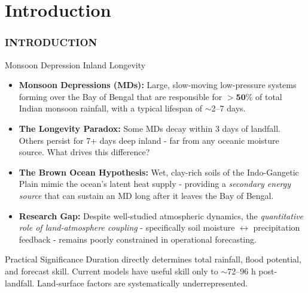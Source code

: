 \documentclass[10pt, aspectratio=169,t,xcolor=table]{beamer}
\begin{document}
\section{Introduction}
\begin{frame}{}
	\frametitle{INTRODUCTION}
\end{frame}

\begin{frame}{Monsoon Depression Inland Longevity}
	\footnotesize
	\begin{itemize}
		\item \textbf{Monsoon Depressions (MDs):} Large, slow-moving low-pressure systems
		      forming over the Bay of Bengal that are responsible for $\mathbf{>50\%}$ of
		      total Indian monsoon rainfall, with a typical lifespan of $\sim$2–7 days.
		      \vspace{0.25cm}
		\item \textbf{The Longevity Paradox:} Some MDs decay within 3 days of landfall.
		      Others persist for 7+ days deep inland - far from any oceanic moisture source.
		      What drives this difference?
		      \vspace{0.25cm}
		\item \textbf{The Brown Ocean Hypothesis:} Wet, clay-rich soils of the
		      Indo-Gangetic Plain mimic the ocean's latent heat supply - providing a
		      \textit{secondary energy source} that can sustain an MD long after it
		      leaves the Bay of Bengal.
		      \vspace{0.25cm}
		\item \textbf{Research Gap:} Despite well-studied atmospheric dynamics, the
		      \textit{quantitative role of land-atmosphere coupling} - specifically
		      soil moisture $\leftrightarrow$ precipitation feedback - remains poorly
		      constrained in operational forecasting.
	\end{itemize}
	\vspace{0.2cm}
	\begin{alertblock}{\small Practical Significance}
		\scriptsize
		Duration directly determines total rainfall, flood potential, and forecast skill.
		Current models have useful skill only to $\sim$72–96 h post-landfall.
		Land-surface factors are systematically underrepresented.
	\end{alertblock}
\end{frame}
\end{document}
